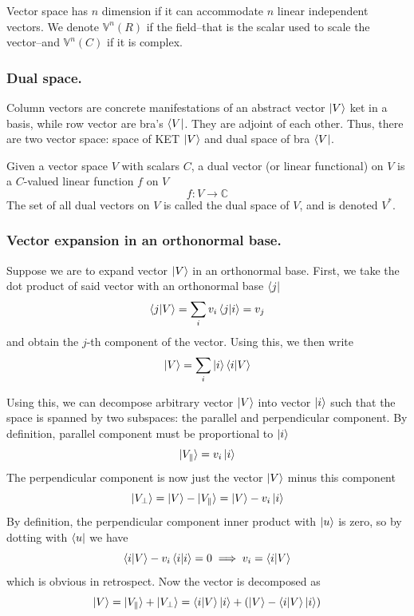 \documentclass[../../../main.tex]{subfiles}
\begin{document}
Vector space has $n$ dimension if it can accommodate $n$ linear independent vectors.
We denote $\mathbb{V}^n(R)$ if the field--that is the scalar used to scale the vector--and $\mathbb{V}^n(C)$ if it is complex.

\subsubsection{Dual space.}
Column vectors are concrete manifestations of an abstract vector $\ket{V}$ ket in a basis, while row vector are bra's $\bra{V}$.
They are adjoint of each other.
Thus, there are two vector space: space of KET $\ket{V}$ and dual space of bra $\bra{V}$.

Given a vector space $V$ with scalars $C$, a dual vector (or linear functional) on $V$ is a $C$-valued linear function $f$ on $V$
\begin{equation*}
	f: V \rightarrow \mathbb{C}
\end{equation*}
The set of all dual vectors on $V$ is called the dual space of $V$, and is denoted $V^*$.

\subsubsection{Vector expansion in an orthonormal base.}
Suppose we are to expand vector $\ket{V}$ in an  orthonormal base.
First, we take the dot product of said vector with an orthonormal base $\bra{j}$
\begin{equation*}
	\braket{j|V}=\sum_i v_i\braket{j|i}=v_j
\end{equation*}
and obtain the $j$-th component of the vector.
Using this, we then write
\begin{equation*}
	\ket{V}=\sum_i \ket{i}\braket{i|V}
\end{equation*}

Using this, we can decompose arbitrary vector $\ket{V}$ into vector $\ket{i}$ such that the space is spanned by two subspaces: the parallel and perpendicular component.
By definition, parallel component must be proportional to $\ket{i }$ 
\begin{equation*}
	\ket{V_\parallel 	}= v_i \ket{i}
\end{equation*}
The perpendicular component is now just the vector $\ket{V}$ minus this component
\begin{equation*}
	\ket{V_{\perp}} = \ket{V }- \ket{V_{\parallel}}= \ket{V }- v_i \ket{i }
\end{equation*}
By definition, the perpendicular component inner product with $\ket{u }$  is zero, so by dotting with $\bra{u }$ we have 
\begin{equation*}
	\braket{i  | V }- v_i \braket{i  | i}=0 \implies v_i = \braket{i  | V}
\end{equation*}
which is obvious in retrospect. 
Now the vector is decomposed as 
\begin{equation*}
	\ket{V }= \ket{V_{\parallel}}+\ket{V_{\perp}} = \braket{i  | V }\ket{i }+\left( \ket{V }- \braket{i  | V }\ket{i }\right) 
\end{equation*}
\end{document}
